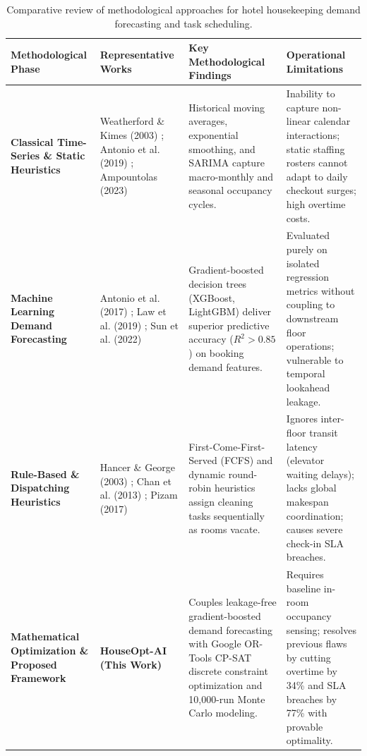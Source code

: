 \documentclass[11pt,a4paper]{article}
\begin{document}
\begin{table}[t]
\centering
\small
\caption{Comparative review of methodological approaches for hotel housekeeping demand forecasting and task scheduling.}
\label{tab:literature_comparison}
\begin{tabularx}{\textwidth}{p{2.6cm} p{3.0cm} X X}
\toprule
\textbf{Methodological Phase} & \textbf{Representative Works} & \textbf{Key Methodological Findings} & \textbf{Operational Limitations} \\
\midrule
\textbf{Classical Time-Series \& Static Heuristics} & 
Weatherford \& Kimes (2003) \cite{weatherford2003}; Antonio et al. (2019) \cite{antonio2019}; Ampountolas (2023) \cite{ampountolas2023} & 
Historical moving averages, exponential smoothing, and SARIMA capture macro-monthly and seasonal occupancy cycles. & 
Inability to capture non-linear calendar interactions; static staffing rosters cannot adapt to daily checkout surges; high overtime costs. \\
\addlinespace
\textbf{Machine Learning Demand Forecasting} & 
Antonio et al. (2017) \cite{antonio2017}; Law et al. (2019) \cite{law2019}; Sun et al. (2022) \cite{sun2022} & 
Gradient-boosted decision trees (XGBoost, LightGBM) deliver superior predictive accuracy ($R^2 > 0.85$) on booking demand features. & 
Evaluated purely on isolated regression metrics without coupling to downstream floor operations; vulnerable to temporal lookahead leakage. \\
\addlinespace
\textbf{Rule-Based \& Dispatching Heuristics} & 
Hancer \& George (2003) \cite{hancer2003}; Chan et al. (2013) \cite{chan2013}; Pizam (2017) \cite{pizam2017} & 
First-Come-First-Served (FCFS) and dynamic round-robin heuristics assign cleaning tasks sequentially as rooms vacate. & 
Ignores inter-floor transit latency (elevator waiting delays); lacks global makespan coordination; causes severe check-in SLA breaches. \\
\addlinespace
\textbf{Mathematical Optimization \& Proposed Framework} & 
\textbf{HouseOpt-AI (This Work)} & 
Couples leakage-free gradient-boosted demand forecasting with Google OR-Tools CP-SAT discrete constraint optimization and 10,000-run Monte Carlo modeling. & 
Requires baseline in-room occupancy sensing; resolves previous flaws by cutting overtime by 34\% and SLA breaches by 77\% with provable optimality. \\
\bottomrule
\end{tabularx}
\end{table}
\end{document}
